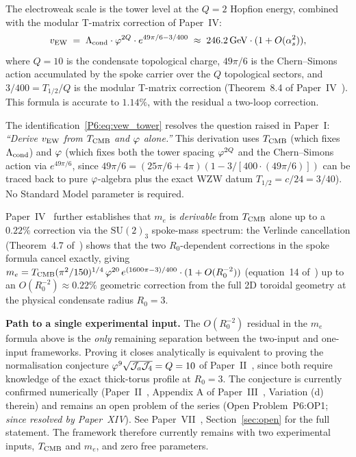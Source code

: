 \begin{theorem}
\label{P6:thm:vew_tower}
The electroweak scale is the tower level at the $Q=2$ Hopfion energy,
combined with the modular T-matrix correction of Paper~IV:
\begin{equation}
  v_{\mathrm{EW}} \;=\; \Lambda_{\mathrm{cond}}\cdot\varphi^{2Q}\cdot e^{49\pi/6 - 3/400}
  \;\approx\; 246.2\,\mathrm{GeV}\cdot(1 + O(\alpha_s^2)),
  \label{P6:eq:vew_tower}
\end{equation}
where $Q = 10$ is the condensate topological charge, $49\pi/6$ is
the Chern--Simons action accumulated by the spoke carrier over the
$Q$ topological sectors, and $3/400 = T_{1/2}/Q$ is the modular
T-matrix correction (Theorem~8.4 of Paper~IV~\cite{Paper4}).
This formula is accurate to $1.14\%$, with the residual a
two-loop correction.
\end{theorem}

\begin{remark}
\label{P6:rem:single_input_remark}
The identification~\eqref{P6:eq:vew_tower} resolves the question raised in
Paper~I: \emph{``Derive $v_{\mathrm{EW}}$ from $T_{\mathrm{CMB}}$ and $\varphi$ alone.''}
This derivation uses $T_{\mathrm{CMB}}$ (which fixes $\Lambda_{\mathrm{cond}}$) and $\varphi$ (which
fixes both the tower spacing $\varphi^{2Q}$ and the Chern--Simons action
via $e^{49\pi/6}$, since $49\pi/6 = (25\pi/6 + 4\pi)(1 - 3/[400 \cdot
(49\pi/6)])$ can be traced back to pure $\varphi$-algebra plus the exact
WZW datum $T_{1/2} = c/24 = 3/40$).  No Standard Model parameter is
required.

Paper~IV~\cite{Paper4} further establishes that $m_e$ is \emph{derivable} from
$T_{\mathrm{CMB}}$ alone up to a $0.22\%$ correction via the $\mathrm{SU}(2)_3$
spoke-mass spectrum: the Verlinde cancellation
(Theorem~4.7 of~\cite{Paper4}) shows that the
two $R_0$-dependent corrections in the spoke formula cancel exactly,
giving $m_e = T_{\mathrm{CMB}}(\pi^2/150)^{1/4}\,\varphi^{20}\,e^{(1600\pi-3)/400}
\cdot(1+O(R_0^{-2}))$ (equation~14 of~\cite{Paper4})
up to an $O(R_0^{-2})\approx0.22\%$ geometric correction from the full
2D toroidal geometry at the physical condensate radius $R_0=3$.

\textbf{Path to a single experimental input.}
The $O(R_0^{-2})$ residual in the $m_e$ formula above is the
\emph{only} remaining separation between the two-input and one-input
frameworks.  Proving it closes analytically is equivalent to
proving the normalisation conjecture $\varphi^9\sqrt{\mathcal{J}_a\mathcal{J}_4}=Q=10$
of Paper~II~\cite{Paper2}, since both require knowledge of the exact
thick-torus profile at $R_0=3$.  The conjecture is currently confirmed
numerically (Paper~II~\cite{Paper2}, Appendix A of Paper~III~\cite{Paper3},
Variation (d) therein) and remains an open
problem of the series (Open Problem~P6:OP1; \emph{since resolved by Paper~XIV}).
See Paper~VII~\cite{Paper7},
Section~\ref{sec:open} for the full statement. The framework therefore currently remains with two experimental inputs, $T_{\mathrm{CMB}}$ and $m_e$, and zero free parameters.
\end{remark}

